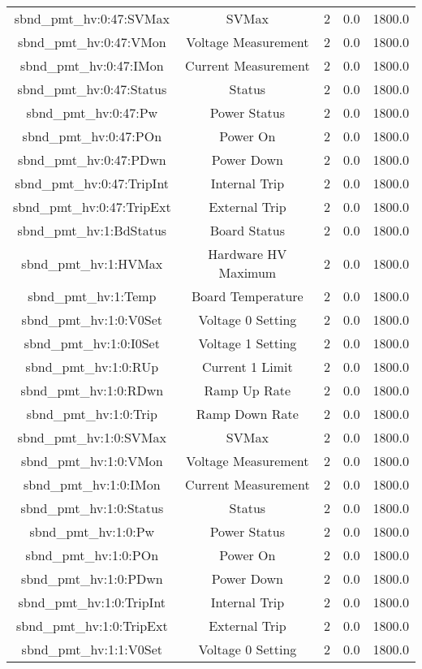 \begin{table}[ptb]
\begin{tabular}{c | c c c c}
sbnd_pmt_hv:0:47:SVMax & SVMax & 2 & 0.0 & 1800.0\\ 
sbnd_pmt_hv:0:47:VMon & Voltage Measurement & 2 & 0.0 & 1800.0\\ 
sbnd_pmt_hv:0:47:IMon & Current Measurement & 2 & 0.0 & 1800.0\\ 
sbnd_pmt_hv:0:47:Status & Status & 2 & 0.0 & 1800.0\\ 
sbnd_pmt_hv:0:47:Pw & Power Status & 2 & 0.0 & 1800.0\\ 
sbnd_pmt_hv:0:47:POn & Power On & 2 & 0.0 & 1800.0\\ 
sbnd_pmt_hv:0:47:PDwn & Power Down & 2 & 0.0 & 1800.0\\ 
sbnd_pmt_hv:0:47:TripInt & Internal Trip & 2 & 0.0 & 1800.0\\ 
sbnd_pmt_hv:0:47:TripExt & External Trip & 2 & 0.0 & 1800.0\\ 
sbnd_pmt_hv:1:BdStatus & Board Status & 2 & 0.0 & 1800.0\\ 
sbnd_pmt_hv:1:HVMax & Hardware HV Maximum & 2 & 0.0 & 1800.0\\ 
sbnd_pmt_hv:1:Temp & Board Temperature & 2 & 0.0 & 1800.0\\ 
sbnd_pmt_hv:1:0:V0Set & Voltage 0 Setting & 2 & 0.0 & 1800.0\\ 
sbnd_pmt_hv:1:0:I0Set & Voltage 1 Setting & 2 & 0.0 & 1800.0\\ 
sbnd_pmt_hv:1:0:RUp & Current 1 Limit & 2 & 0.0 & 1800.0\\ 
sbnd_pmt_hv:1:0:RDwn & Ramp Up Rate & 2 & 0.0 & 1800.0\\ 
sbnd_pmt_hv:1:0:Trip & Ramp Down Rate & 2 & 0.0 & 1800.0\\ 
sbnd_pmt_hv:1:0:SVMax & SVMax & 2 & 0.0 & 1800.0\\ 
sbnd_pmt_hv:1:0:VMon & Voltage Measurement & 2 & 0.0 & 1800.0\\ 
sbnd_pmt_hv:1:0:IMon & Current Measurement & 2 & 0.0 & 1800.0\\ 
sbnd_pmt_hv:1:0:Status & Status & 2 & 0.0 & 1800.0\\ 
sbnd_pmt_hv:1:0:Pw & Power Status & 2 & 0.0 & 1800.0\\ 
sbnd_pmt_hv:1:0:POn & Power On & 2 & 0.0 & 1800.0\\ 
sbnd_pmt_hv:1:0:PDwn & Power Down & 2 & 0.0 & 1800.0\\ 
sbnd_pmt_hv:1:0:TripInt & Internal Trip & 2 & 0.0 & 1800.0\\ 
sbnd_pmt_hv:1:0:TripExt & External Trip & 2 & 0.0 & 1800.0\\ 
sbnd_pmt_hv:1:1:V0Set & Voltage 0 Setting & 2 & 0.0 & 1800.0\\ 

\end{tabular}
\end{table}
